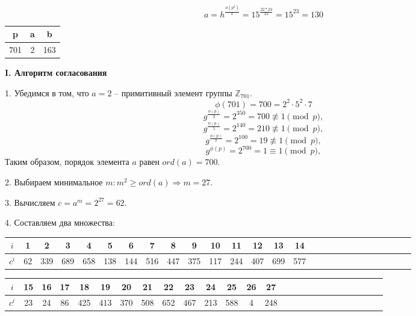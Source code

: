 $$ a = h ^ { \frac{\phi(p ^ 2)}{k} } = 15 ^ { \frac{22 * 23}{22} } = 15 ^ {23} = 130 $$


\medskip

{\centering
\begin{tabular}{||c|c|c||}
\hline
\textbf{p} & \textbf{a} & \textbf{b} \\
\hline
701 & 2 & 163 \\
\hline
\end{tabular}

}

\medskip

\noindent \textbf{I. Алгоритм согласования }

1. Убедимся в том, что $a=2$ -- примитивный элемент группы $\mathbb{Z}_{701}$.
$$\phi(701) = 700 = 2^2 \cdot 5^2 \cdot 7$$
$$ g^{ \frac{\phi(p)}{2} } = 2 ^ {350} = 700 \not\equiv 1 \pmod p,$$
$$ g^{ \frac{\phi(p)}{5} } = 2 ^ {140} = 210 \not\equiv 1 \pmod p,$$
$$ g^{ \frac{\phi(p)}{7} } = 2 ^ {100} = 19 \not\equiv 1 \pmod p,$$
$$ g^{ \phi(p) } = 2 ^ {700} = 1 \equiv 1 \pmod p,$$
\noindent Таким образом, порядок элемента $a$ равен $ord(a) = 700$.

2. Выбираем минимальное $m \colon m^2 \ge ord(a) \Rightarrow m = 27.$ 

3. Вычисляем $c = a^m = 2 ^ {27} = 62.$

4. Составляем два множества:

\medskip

{\centering
\begin{tabular}{||c|c|c|c|c|c|c|c|c|c|c|c|c|c|c|c|c|c|c|c|c|c|c|c|c|c|c||}
\hline
$i$ & 1 & 2 & 3 & 4 & 5 & 6 & 7 & 8 & 9 & 10 & 11 & 12 & 13 & 14 \\
\hline
$c^i$ & 62 & 339 & 689 & 658 & 138 & 144 & 516 & 447 & 375 & 117 & 244 & 407 & 699 & 577 \\
\hline
\end{tabular}

}

\medskip

{\centering
\begin{tabular}{||c|c|c|c|c|c|c|c|c|c|c|c|c|c|c|c|c|c|c|c|c|c|c|c|c|c||}
\hline
$i$ & 15 & 16 & 17 & 18 & 19 & 20 & 21 & 22 & 23 & 24 & 25 & 26 & 27 \\
\hline
$c^i$ & 23 & 24 & 86 & 425 & 413 & 370 & 508 & 652 & 467 & 213 & 588 & 4 & 248 \\
\hline
\end{tabular}

}

